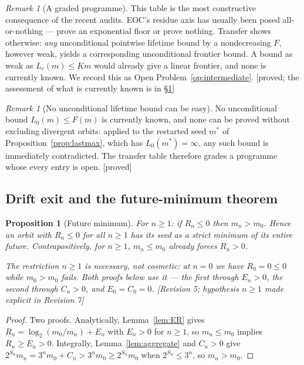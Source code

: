 \documentclass[11pt]{article}
\theoremstyle{plain}
\newtheorem{proposition}[theorem]{Proposition}
\theoremstyle{definition}
\theoremstyle{remark}
\newtheorem{remark}[theorem]{Remark}
\newcommand{\status}[1]{\textsf{\footnotesize[#1]}}
\begin{document}
\begin{remark}[A graded programme]\label{rem:graded}
This table is the most constructive consequence of the recent audits. EOC's residue axis has
usually been posed all-or-nothing --- prove an exponential floor or prove nothing. Transfer shows
otherwise: \emph{any} unconditional pointwise lifetime bound by a nondecreasing $F$, however weak,
yields a corresponding unconditional frontier bound. A bound as weak as $L_c(m)\le Km$ would already give a linear
frontier, and none is currently known. We record this as Open Problem~\ref{op:intermediate}.
\status{proved; the assessment of what is currently known is in \S\ref{sec:nounconditional}}
\end{remark}

\begin{remark}[No unconditional lifetime bound can be easy]\label{sec:nounconditional}
No unconditional bound $L_0(m)\le F(m)$ is currently known, and none can be proved without
excluding divergent orbits: applied to the restarted seed $m^*$ of
Proposition~\ref{prop:lastmax}, which has $L_0(m^*)=\infty$, any such bound is immediately
contradicted. The transfer table therefore grades a programme whose every entry is open.
\status{proved}
\end{remark}

\subsection{Drift exit and the future-minimum theorem}\label{sec:driftexit}

\begin{proposition}[Future minimum]\label{prop:futuremin}
For $n\ge1$: if $R_n\le0$ then $m_n>m_0$. Hence an orbit with $R_n\le0$ for all $n\ge1$ has its
seed as a \emph{strict minimum of its entire future}. Contrapositively, for $n\ge1$, $m_n\le m_0$
already forces $R_n>0$.

The restriction $n\ge1$ is necessary, not cosmetic: at $n=0$ we have $R_0=0\le0$ while
$m_0>m_0$ fails. Both proofs below use it --- the first through $E_n>0$, the second through
$C_n>0$, and $E_0=C_0=0$. \status{Revision 5; hypothesis $n\ge1$ made explicit in Revision 7}
\end{proposition}

\begin{proof}
Two proofs. Analytically, Lemma~\ref{lem:ER} gives $R_n=\log_2(m_0/m_n)+E_n$ with $E_n>0$ for
$n\ge1$, so $m_n\le m_0$ implies $R_n\ge E_n>0$. Integrally, Lemma~\ref{lem:aggregate} and
$C_n>0$ give $2^{S_n}m_n=3^nm_0+C_n>3^nm_0\ge2^{S_n}m_0$ when $2^{S_n}\le3^n$, so $m_n>m_0$.
\end{proof}
\end{document}
